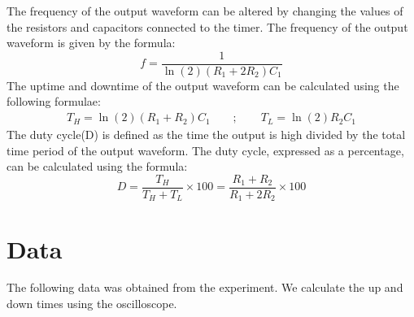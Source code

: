 \documentclass{scrartcl}
\newcommand{\1}{\mathbbm{1}}
\begin{document}
The frequency of the output waveform can be altered by changing the values of the resistors and capacitors connected to the timer.
The frequency of the output waveform is given by the formula:
\begin{equation}
    f = \frac{1}{\ln(2)(R_1 + 2R_2)C_1}
\end{equation}
The uptime and downtime of the output waveform can be calculated using the following formulae:
\begin{align}
    T_{H} = \ln(2)(R_1 + R_2)C_1\quad\quad;\quad\quad
    T_{L} = \ln(2)R_2C_1
\end{align}
The duty cycle(D) is defined as the time the output is high divided by the total time period of the output waveform.
The duty cycle, expressed as a percentage, can be calculated using the formula:
\begin{equation}
    D = \frac{T_{H}}{T_{H} + T_{L}} \times 100 = \frac{R_1 + R_2}{R_1 + 2R_2} \times 100 
\end{equation}

\section{Data}

The following data was obtained from the experiment. We calculate the up and down times using the oscilloscope.
\end{document}
